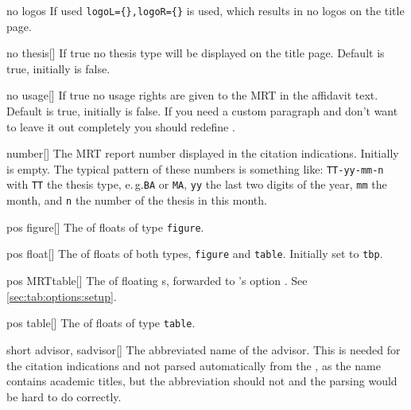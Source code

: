 \begin{describeopt}{no logos}
  If used \verb|logoL={},logoR={}| is used, which results in no logos on the
  title page.
\end{describeopt}
\begin{describeopt}{no thesis}[]
  If true no thesis type will be displayed on the title page. Default is true,
  initially is false.
\end{describeopt}
\begin{describeopt}{no usage}[]
  If true no usage rights are given to the MRT in the affidavit text. Default is
  true, initially is false. If you need a custom paragraph and don't want to
  leave it out completely you should redefine .
\end{describeopt}
\begin{describeopt}{number}[]
  The MRT report number displayed in the citation indications. Initially is
  empty. The typical pattern of these numbers is something like:
  \texttt{TT-yy-mm-n} with \texttt{TT} the thesis type, e.\,g.\@ \texttt{BA} or
  \texttt{MA}, \texttt{yy} the last two digits of the year, \texttt{mm} the
  month, and \texttt{n} the number of the thesis in this month.
\end{describeopt}
\begin{describeopt}{pos figure}[]
  The  of floats of type \texttt{figure}.
\end{describeopt}
\begin{describeopt}{pos float}[]
  The  of floats of both types, \texttt{figure} and
  \texttt{table}. Initially set to \texttt{tbp}.
\end{describeopt}
\begin{describeopt}{pos MRTtable}[]
  The  of floating s, forwarded to 's
  option . See \autoref{sec:tab:options:setup}.
\end{describeopt}
\begin{describeopt}{pos table}[]
  The  of floats of type \texttt{table}.
\end{describeopt}
\begin{describeopt}{short advisor, sadvisor}[]
  The abbreviated name of the advisor. This is needed for the citation
  indications and not parsed automatically from the , as the name
  contains academic titles, but the abbreviation should not and the parsing
  would be hard to do correctly.
\end{describeopt}
